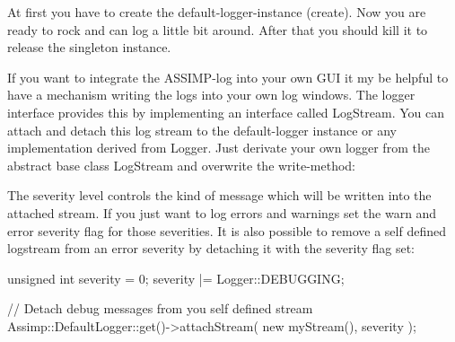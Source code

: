 At first you have to create the default-\/logger-\/instance (create). Now you are ready to rock and can log a little bit around. After that you should kill it to release the singleton instance.

If you want to integrate the A\+S\+S\+I\+M\+P-\/log into your own G\+U\+I it my be helpful to have a mechanism writing the logs into your own log windows. The logger interface provides this by implementing an interface called Log\+Stream. You can attach and detach this log stream to the default-\/logger instance or any implementation derived from Logger. Just derivate your own logger from the abstract base class Log\+Stream and overwrite the write-\/method\+:




The severity level controls the kind of message which will be written into the attached stream. If you just want to log errors and warnings set the warn and error severity flag for those severities. It is also possible to remove a self defined logstream from an error severity by detaching it with the severity flag set\+:


\begin{DoxyCode}
\textcolor{keywordtype}{unsigned} \textcolor{keywordtype}{int} severity = 0;
severity |= Logger::DEBUGGING;

\textcolor{comment}{// Detach debug messages from you self defined stream}
Assimp::DefaultLogger::get()->attachStream( \textcolor{keyword}{new} myStream(), severity );
\end{DoxyCode}


